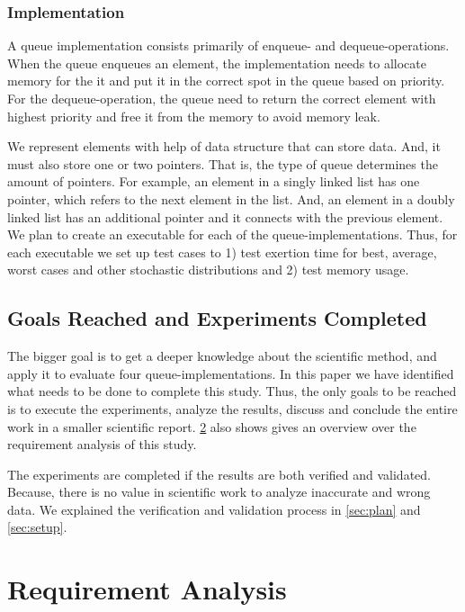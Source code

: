 \documentclass[a4paper,11pt]{kth-mag}
\newcommand*{\skippara}{\par\vspace{\baselineskip} \noindent}
\begin{document}
\subsection{Implementation}
A queue implementation consists primarily of enqueue- and dequeue-operations.
When the queue enqueues an element, the implementation needs to allocate memory for the it and put it in the correct spot in the queue based on priority.
For the dequeue-operation, the queue need to return the correct element with highest priority and free it from the memory to avoid memory leak.

\skippara We represent elements with help of data structure that can store data.
And, it must also store one or two pointers.
That is, the type of queue determines the amount of pointers.
For example, an element in a singly linked list has one pointer, which refers to the next element in the list.
And, an element in a doubly linked list has an additional pointer and it connects with the previous element.
We plan to create an executable for each of the queue-implementations.
Thus, for each executable we set up test cases to 1) test exertion time for best, average, worst cases and other stochastic distributions and 2) test memory usage.

\skippara

\section{Goals Reached and Experiments Completed}\label{sec:goal}
The bigger goal is to get a deeper knowledge about the scientific method, and apply it to evaluate four queue-implementations.
In this paper we have identified what needs to be done to complete this study.
Thus, the only goals to be reached is to execute the experiments, analyze the results, discuss and conclude the entire work in a smaller scientific report.
\cref{app:A} also shows gives an overview over the requirement analysis of this study.

\skippara The experiments are completed if the results are both verified and validated.
Because, there is no value in scientific work to analyze inaccurate and wrong data.
We explained the verification and validation process in \cref{sec:plan} and \cref{sec:setup}.



\appendix
\addappheadtotoc
\chapter{Requirement Analysis}\label{app:A}
\end{document}
